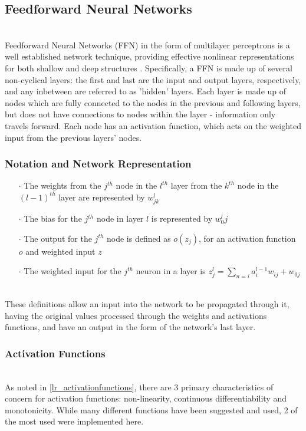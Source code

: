 \documentclass[a4paper,latin]{paper}
\begin{document}
\subsection{Feedforward Neural Networks}\label{imp_ffn}
~\\
Feedforward Neural Networks (FFN) in the form of multilayer perceptrons is a well established network technique, providing effective nonlinear representations for both shallow and deep structures \cite{Schmidhuber}. Specifically, a FFN is made up of several non-cyclical layers: the first and last are the input and output layers, respectively, and any inbetween are referred to as 'hidden' layers. Each layer is made up of nodes which are fully connected to the nodes in the previous and following layers, but does not have connections to nodes within the layer - information only travels forward. Each 
node has an activation function, which acts on the weighted input from the previous layers' nodes.

\subsubsection{Notation and Network Representation}\label{imp_ffn_functions}

\begin{itemize}
\item[$\cdot$] The weights from the $j^{th}$ node in the $l^{th}$ layer from the $k^{th}$ node in the $(l-1)^{th}$ layer are represented by $w^l_{jk}$
\item[$\cdot$] The bias for the $j^{th}$ node in layer $l$ is represented by $w^l_0j$
\item[$\cdot$] The output for the $j^{th}$ node is defined as $o(z_j)$, for an activation function $o$ and weighted input $z$
\item[$\cdot$] The weighted input for the $j^{th}$ neuron in a layer is $z^l_j=\sum_{n=i}{a^{l-1}_iw_{ij}} + w_{0j}$
\end{itemize}
~\\
These definitions allow an input into the network to be propagated through it, having the original values processed through the weights and activations functions, and have an output in the form of the network's last layer.

\subsubsection{Activation Functions}
~\\
As noted in \ref{lr_activationfunctions}, there are 3 primary characteristics of concern for activation functions: non-linearity, continuous differentiability and monotonicity. While many different functions have been suggested and used, 2 of the most used were implemented here.
\end{document}
